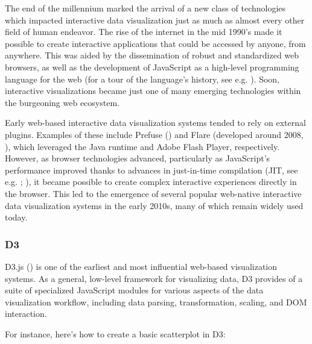 \documentclass[
]{book}
\begin{document}
The end of the millennium marked the arrival of a new class of technologies which impacted interactive data visualization just as much as almost every other field of human endeavor. The rise of the internet in the mid 1990's made it possible to create interactive applications that could be accessed by anyone, from anywhere. This was aided by the dissemination of robust and standardized web browsers, as well as the development of JavaScript as a high-level programming language for the web (for a tour of the language's history, see e.g. ). Soon, interactive visualizations became just one of many emerging technologies within the burgeoning web ecosystem.

Early web-based interactive data visualization systems tended to rely on external plugins. Examples of these include Prefuse () and Flare (developed around 2008, ), which leveraged the Java runtime and Adobe Flash Player, respectively. However, as browser technologies advanced, particularly as JavaScript's performance improved thanks to advances in just-in-time compilation (JIT, see e.g. ; ), it became possible to create complex interactive experiences directly in the browser. This led to the emergence of several popular web-native interactive data visualization systems in the early 2010s, many of which remain widely used today.

\subsubsection{D3}\label{d3}

D3.js () is one of the earliest and most influential web-based visualization systems. As a general, low-level framework for visualizing data, D3 provides of a suite of specialized JavaScript modules for various aspects of the data visualization workflow, including data parsing, transformation, scaling, and DOM interaction.

For instance, here's how to create a basic scatterplot in D3:
\end{document}
